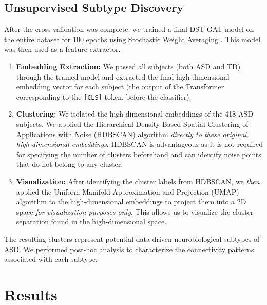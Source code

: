 \documentclass[10pt]{article}
\begin{document}
\subsection{Unsupervised Subtype Discovery}
After the cross-validation was complete, we trained a final DST-GAT model on the entire dataset for 100 epochs using Stochastic Weight Averaging \parencite{izmailov2018averaging}. This model was then used as a feature extractor.
\begin{enumerate}
    \item \textbf{Embedding Extraction:} We passed all subjects (both ASD and TD) through the trained model and extracted the final high-dimensional embedding vector for each subject (the output of the Transformer corresponding to the \texttt{[CLS]} token, before the classifier).
    \item \textbf{Clustering:} We isolated the high-dimensional embeddings of the 418 ASD subjects. We applied the Hierarchical Density Based Spatial Clustering of Applications with Noise (HDBSCAN) algorithm \parencite{campello2013density} \textit{directly to these original, high-dimensional embeddings}. HDBSCAN is advantageous as it is not required for specifying the number of clusters beforehand and can identify noise points that do not belong to any cluster.
    \item \textbf{Visualization:} After identifying the cluster labels from HDBSCAN, we \textit{then} applied the Uniform Manifold Approximation and Projection (UMAP) algorithm \parencite{mcinnes2018umap} to the high-dimensional embeddings to project them into a 2D space \textit{for visualization purposes only}. This allows us to visualize the cluster separation found in the high-dimensional space.
\end{enumerate}
The resulting clusters represent potential data-driven neurobiological subtypes of ASD. We performed post-hoc analysis to characterize the connectivity patterns associated with each subtype.

\section{Results}
\end{document}
